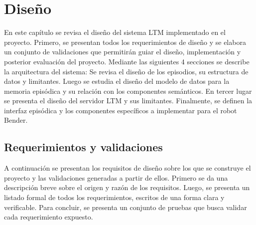 \chapter{Diseño}\label{chapter:diseno}

En este capítulo se revisa el diseño del sistema LTM implementado en el proyecto. Primero, se presentan todos los requerimientos de diseño y se elabora un conjunto de validaciones que permitirán guiar el diseño, implementación y posterior evaluación del proyecto. Mediante las siguientes 4 secciones se describe la arquitectura del sistema: Se revisa el diseño de los episodios, su estructura de datos y limitantes. Luego se estudia el diseño del modelo de datos para la memoria episódica y su relación con los componentes semánticos. En tercer lugar se presenta el diseño del servidor LTM y sus limitantes. Finalmente, se definen la interfaz episódica y los componentes específicos a implementar para el robot Bender.




\section{Requerimientos y validaciones}

A continuación se presentan los requisitos de diseño sobre los que se construye el proyecto y las validaciones generadas a partir de ellos. Primero se da una descripción breve sobre el origen y razón de los requisitos. Luego, se presenta un listado formal de todos los requerimientos, escritos de una forma clara y verificable. Para concluir, se presenta un conjunto de pruebas que busca validar cada requerimiento expuesto.

